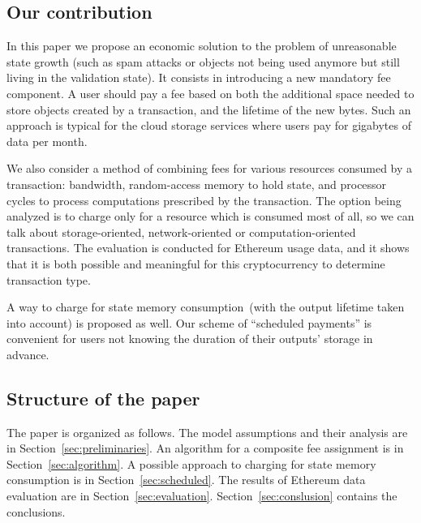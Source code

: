 \documentclass[]{llncs}   %
\begin{document}
\subsection{Our contribution}

In this paper we propose an economic solution to the problem of unreasonable state growth
(such as spam attacks or objects not being used anymore but still living in
the validation state). It consists in introducing a new mandatory fee component. A 
user should pay a fee based on both the additional space needed to store objects
created by a transaction, and the lifetime of the new bytes. Such an approach is
typical for the cloud storage services where users pay for gigabytes of data per
month. 

We also consider a method of combining fees for various resources consumed by a transaction:
bandwidth, random-access memory to hold state, and processor cycles to process computations prescribed by the transaction.    
The option being analyzed is to charge only for a resource which is consumed most of all, so we can talk about storage-oriented,
network-oriented or computation-oriented transactions. The evaluation is
conducted for Ethereum usage data, and it shows
that it is both possible and meaningful for this cryptocurrency to determine transaction type.

A way to charge for state memory consumption~(with the
output lifetime taken into account) is proposed as well.
Our scheme of ``scheduled payments'' is convenient for users not knowing the
duration of their outputs' storage in advance.





\subsection{Structure of the paper}
The paper is organized as follows. The model assumptions and their analysis are in
Section~\ref{sec:preliminaries}. An algorithm for a composite fee assignment is
in Section~\ref{sec:algorithm}. A possible approach to charging for state memory
consumption is in Section~\ref{sec:scheduled}. The results of Ethereum data
evaluation are in Section~\ref{sec:evaluation}. Section~\ref{sec:conslusion}
contains the conclusions.
\end{document}
